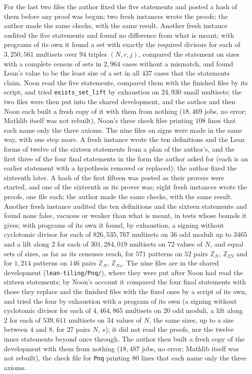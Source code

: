 \documentclass[11pt,a4paper]{amsart}
\theoremstyle{definition}
\theoremstyle{remark}
\newcommand{\Z}{\mathbb{Z}}
\newcommand{\lean}[1]{\texttt{#1}}
\begin{document}
For the last two files the author fixed the five statements and posted a hash of them before any proof was begun; two fresh instances wrote the proofs; the author made the same checks, with the same result. Another fresh instance audited the five statements and found no difference from what is meant; with programs of its own it found a set with exactly the required divisors for each of $3{,}250{,}561$ multisets over $94$ triples $(N,r,j)$, compared the statement on sizes with a complete census of sets in $2{,}964$ cases without a mismatch, and found Lean's value to be the least size of a set in all $437$ cases that the statements claim. Noon read the five statements, compared them with the finished files by its script, and tried \lean{exists\_set\_lift} by exhaustion on $24{,}930$ small multisets; the two files were then put into the shared development, and the author and then Noon each built a fresh copy of it with them from nothing ($18{,}469$ jobs, no error; Mathlib itself was not rebuilt), Noon's three check files printing $108$ lines that each name only the three axioms.
The nine files on signs were made in the same way, with one step more. A fresh instance wrote the ten definitions and the Lean forms of twelve of the sixteen statements from a plan of the author's, and the first three of the four final statements in the form the author asked for (each is an earlier statement with a hypothesis removed or replaced); the author fixed the sixteenth later. A hash of the first fifteen was posted as their provers were started, and one of the sixteenth as its prover was; eight fresh instances wrote the proofs, one file each; the author made the same checks, with the same result. Another fresh instance audited the ten definitions and the sixteen statements and found none false, vacuous or weaker than what is meant, in tests whose bounds it gives; with programs of its own it found, by exhaustion, a signing without cyclotomic divisor for each of $826{,}535{,}767$ multisets on $36$ odd moduli up to $3465$ and a lift along $2$ for each of $301{,}284{,}019$ multisets on $72$ values of $N$, and equal sets of sizes, as far as its censuses reach, for $571$ patterns on $52$ pairs $\Z_N$, $\Z_{2N}$ and for $1{,}214$ patterns on $146$ pairs $\Z_N$, $\Z_{Ns}$. The nine files are in the shared development (\lean{lean-tiling/Pnq/}), where they were put after Noon had read the sixteen statements; by Noon's account it compared the four final statements with those they replace and the finished files with the fixed ones by a script of its own, and tried the four by exhaustion with a program of its own (a signing without cyclotomic divisor for each of $4{,}464{,}865$ multisets on $20$ odd moduli, a lift along $2$ for each of $539{,}611$ multisets on $34$ values of $N$, the same sizes, up to a size between $4$ and $8$, for $27$ pairs $N$, $s$); it did not read the proofs, nor the twelve inner statements beyond once through. The author then built a fresh copy of the development with them from nothing ($18{,}487$ jobs, no error; Mathlib itself was not rebuilt), the check file for \lean{Pnq} printing $80$ lines that each name only the three axioms.
\end{document}
